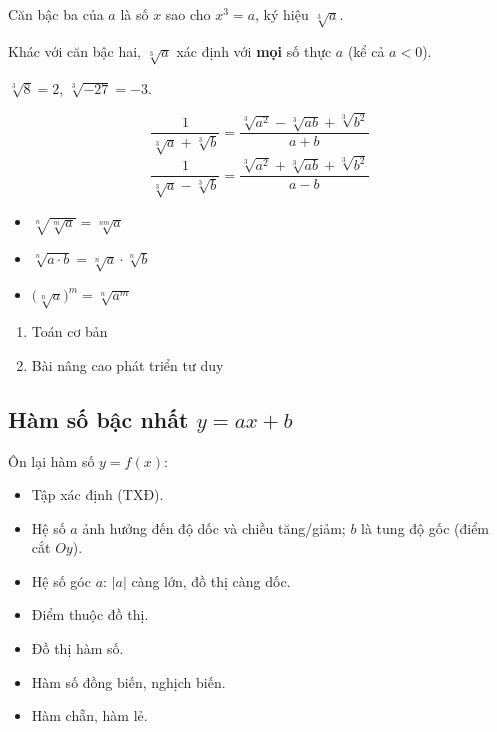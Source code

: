\documentclass[12pt,a4paper]{article}
\begin{document}
\begin{dinhnghia}
  Căn bậc ba của $a$ là số $x$ sao cho $x^3 = a$, ký hiệu $\sqrt[3]{a}$.

  Khác với căn bậc hai, $\sqrt[3]{a}$ xác định với \textbf{mọi} số thực $a$ (kể cả $a < 0$).
\end{dinhnghia}

\begin{vidu}
  $\sqrt[3]{8} = 2$, \quad $\sqrt[3]{-27} = -3$.
\end{vidu}

\begin{congthuc}[title={Trục căn thức ở mẫu với căn bậc ba}]
  \[\frac{1}{\sqrt[3]{a} + \sqrt[3]{b}} = \frac{\sqrt[3]{a^2} - \sqrt[3]{ab} + \sqrt[3]{b^2}}{a + b}\]
  \[\frac{1}{\sqrt[3]{a} - \sqrt[3]{b}} = \frac{\sqrt[3]{a^2} + \sqrt[3]{ab} + \sqrt[3]{b^2}}{a - b}\]
\end{congthuc}

\begin{tinhchat}[title={Căn bậc $n$}]
  \begin{itemize}
    \item $\sqrt[n]{\sqrt[m]{a}} = \sqrt[nm]{a}$
    \item $\sqrt[n]{a \cdot b} = \sqrt[n]{a} \cdot \sqrt[n]{b}$
    \item $\bigl(\sqrt[n]{a}\bigr)^m = \sqrt[n]{a^m}$
  \end{itemize}
\end{tinhchat}

\begin{enumerate}[label=\textbf{Dạng \arabic*:}, leftmargin=*, align=left]
  \item Toán cơ bản
  \item Bài nâng cao phát triển tư duy
\end{enumerate}

\subsection{Hàm số bậc nhất $y = ax + b$}

\begin{dinhnghia}
  Ôn lại hàm số $y = f(x)$:
  \begin{itemize}
    \item Tập xác định (TXĐ).
    \item Hệ số $a$ ảnh hưởng đến độ dốc và chiều tăng/giảm; $b$ là tung độ gốc (điểm cắt $Oy$).
    \item Hệ số góc $a$: $|a|$ càng lớn, đồ thị càng dốc.
    \item Điểm thuộc đồ thị.
    \item Đồ thị hàm số.
    \item Hàm số đồng biến, nghịch biến.
    \item Hàm chẵn, hàm lẻ.
  \end{itemize}
\end{dinhnghia}
\end{document}
